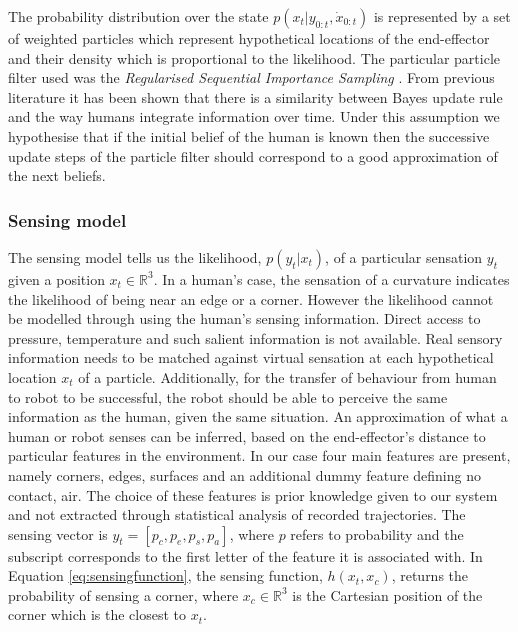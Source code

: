 The probability distribution over the state $p(x_{t}|y_{0:t},\dot{x}_{0:t})$ is represented by a set of weighted particles which represent hypothetical
locations of the end-effector and  their density which is proportional to the likelihood. The particular particle filter used was the 
\textit{Regularised Sequential Importance Sampling} \cite[p.182]{Arul_Mask_Clap_2002}. From previous literature \cite{Bake_Saxe_Tene_2011} 
it has been shown that there is a similarity between Bayes update rule and the way humans integrate information over time. Under this assumption we hypothesise that if the initial belief of the human is known then the successive update steps of the particle filter should correspond to a good approximation 
of the next beliefs. 

\subsubsection{Sensing model}

The sensing model tells us the likelihood, $p(y_t|x_t)$, of a particular sensation $y_t$ given
a position $x_t \in \mathbb{R}^{3}$. In a human's case, the sensation of a curvature indicates the 
likelihood of being near an edge or a corner. However the likelihood cannot be modelled through using 
the human's sensing information. Direct access to pressure, temperature and such salient information is not available. 
Real sensory information needs to be matched against virtual sensation at each hypothetical location $x_t$ of a particle. 
Additionally,  for the transfer of behaviour from human to robot to be successful, the robot should be
able to perceive the same information as the human, given the same situation. An approximation of what a human or robot senses 
can be inferred, based on the end-effector's distance to particular features in the environment. In our case four main features 
are present, namely corners, edges, surfaces and an additional dummy feature defining no contact, air. The choice of these features is prior knowledge 
given to our system and not extracted through statistical analysis of recorded trajectories. The sensing vector is $y_t = \left[p_c,p_e,p_s,p_a\right]$, 
where $p$ refers to probability and the subscript corresponds to the first letter of the feature it is associated with. In Equation \ref{eq:sensingfunction}, 
the sensing function, $h(x_t,x_c)$, returns the probability of sensing a corner, where $x_c \in \mathbb{R}^3$ is the Cartesian position of the corner which is
the closest to $x_t$. 

